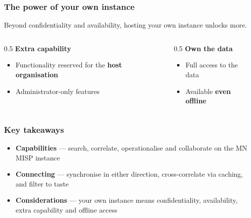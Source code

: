 \begin{frame}
    \frametitle{The power of your own instance}

    Beyond confidentiality and availability, hosting your own instance unlocks more.

    \vspace{0.5em}

    \begin{center}
        \begin{columns}[T]
            \begin{column}{0.5\textwidth}
                \card{\linewidth}{2.5em}
                    {{\Large\faTools}\hspace{0.3em}\textbf{Extra capability}}
                    {
                        \begin{itemize}
                            \item Functionality reserved for the \textbf{host organisation}
                            \item Administrator-only features
                        \end{itemize}
                    }
            \end{column}
            \begin{column}{0.5\textwidth}
                \card{\linewidth}{2.5em}
                    {{\Large\faDatabase}\hspace{0.3em}\textbf{Own the data}}
                    {
                        \begin{itemize}
                            \item Full access to the data
                            \item Available \textbf{even offline}
                        \end{itemize}
                    }
            \end{column}
        \end{columns}
    \end{center}
\end{frame}


\begin{frame}
    \frametitle{Key takeaways}

    \begin{itemize}
        \item \textbf{Capabilities} --- search, correlate, operationalise and collaborate
              on the MN MISP instance
        \item \textbf{Connecting} --- synchronise in either direction, cross-correlate via
              caching, and filter to taste
        \item \textbf{Considerations} --- your own instance means confidentiality,
              availability, extra capability and offline access
    \end{itemize}

    \vspace{1em}

\end{frame}
